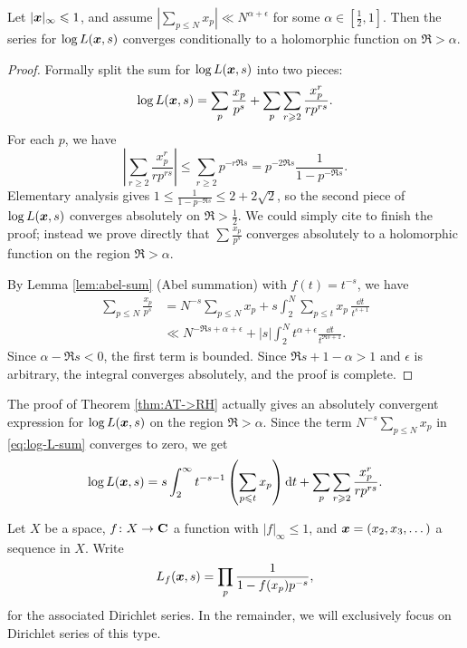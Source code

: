 \begin{theorem}\label{thm:AT->RH}
Let $|{\boldsymbol x}|_\infty \leqslant 1$, and assume 
$|\sum_{p\leqslant N} x_p| \ll N^{\alpha+\epsilon}$ for some 
$\alpha\in [\frac 1 2,1]$. Then the series for $\log L({\boldsymbol x},s)$ converges 
conditionally to a holomorphic function on $\Re > \alpha$. 
\end{theorem}
\begin{proof}
Formally split the sum for $\log L({\boldsymbol x},s)$ into two pieces: 
\[
	\log L({\boldsymbol x},s) = \sum_p \frac{x_p}{p^s} + \sum_p \sum_{r\geqslant 2} \frac{x_p^r}{r p^{r s}} .
\]
For each $p$, we have 
\[
	\left| \sum_{r\geqslant 2} \frac{x_p^r}{r p^{r s}}\right| \leqslant \sum_{r\geqslant 2} p^{- r \Re s} = p^{-2 \Re s} \frac{1}{1-p^{-\Re s}} .
\]
Elementary analysis gives 
$1 \leqslant \frac{1}{1-p^{-\Re s}} \leqslant 2 + 2\sqrt 2$, so the second 
piece of $\log L({\boldsymbol x},s)$ converges absolutely on $\Re >\frac 1 2$. We could 
simply cite \cite[II.1 Th.~10]{tenenbaum-1995} to finish the proof; instead we 
prove directly that $\sum \frac{x_p}{p^s}$ converges absolutely to a 
holomorphic function on the region $\Re > \alpha$. 

By Lemma \ref{lem:abel-sum} (Abel summation) with $f(t) = t^{-s}$, we have 
\begin{align}
	\sum_{p\leqslant N} \frac{x_p}{p^s}
		&= N^{-s} \sum_{p\leqslant N} x_p + s \int_2^N \sum_{p\leqslant t} x_p\, \frac{\dd t}{t^{s+1}} \label{eq:log-L-sum} \\ 
		&\ll N^{-\Re s + \alpha + \epsilon} + |s| \int_2^N t^{\alpha+\epsilon} \frac{\dd t}{t^{\Re s+1}} . \nonumber
\end{align}
Since $\alpha-\Re s < 0$, the first term is bounded. Since 
$\Re s+1-\alpha > 1$ and 
$\epsilon$ is arbitrary, the integral converges absolutely, and the proof is 
complete. 
\end{proof}

The proof of Theorem \ref{thm:AT->RH} actually gives an absolutely 
convergent expression for $\log L({\boldsymbol x},s)$ on the region $\Re >\alpha$. Since 
the term $N^{-s} \sum_{p\leqslant N} x_p$ in \eqref{eq:log-L-sum} 
converges to zero, we get 
\[
	\log L({\boldsymbol x},s) = s \int_2^\infty t^{-s-1}\left(\sum_{p\leqslant t} x_p\right) \mathrm{d} t + \sum_p \sum_{r\geqslant 2} \frac{x_p^r}{r p^{r s}} . 
\]

Let $X$ be a space, $f\colon X\to \mathbf{C}$ a function with 
$|f|_\infty\leqslant 1$, and ${\boldsymbol x}=(x_2,x_3,\dots)$ a sequence in $X$. Write 
\[
	L_f({\boldsymbol x},s) = \prod_p \frac{1}{1-f(x_p) p^{-s}} ,
\]
for the associated Dirichlet series. In the remainder, we will 
exclusively focus on Dirichlet series of this type. 






